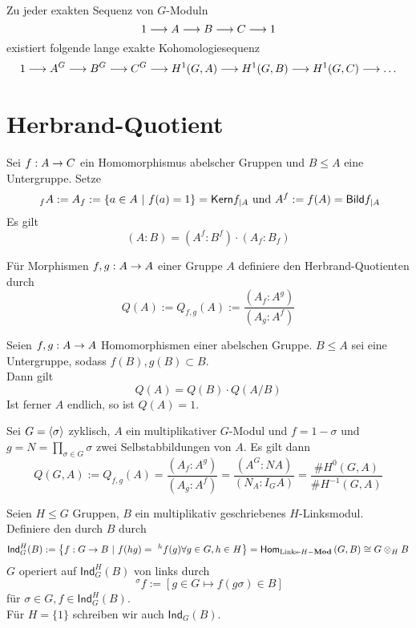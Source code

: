 \documentclass{book}
\renewcommand{\i}{^{-1}}
\begin{document}
Zu jeder exakten Sequenz von $G$-Moduln
\[ 1 \overset{}{\longrightarrow} A \overset{}{\longrightarrow} B \overset{}{\longrightarrow} C \overset{}{\longrightarrow} 1\]
existiert folgende lange exakte Kohomologiesequenz
\begin{align*}
1 \overset{}{\longrightarrow} A^G \overset{}{\longrightarrow} B^G \overset{}{\longrightarrow} C^G \overset{}{\longrightarrow} H^1(G,A) \overset{}{\longrightarrow} H^1(G,B) \overset{}{\longrightarrow} H^1(G,C) \overset{}{\longrightarrow} \ldots
\end{align*}

\section{Herbrand-Quotient}
\Lem{}
Sei $f : A \overset{}{\rightarrow} C$ ein Homomorphismus abelscher Gruppen und $B \leq A$ eine Untergruppe. Setze
\[ \ _fA := A_f := \set{a\in A}{f(a) = 1} = \Ker f_{|A} \text{ und } A^f := f(A) = \Img f_{|A} \]
Es gilt
\[ (A:B) = (A^f:B^f) \cdot (A_f : B_f) \]

Für Morphismen $f, g : A\overset{}{\rightarrow} A $ einer Gruppe $A$ definiere den Herbrand-Quotienten durch
\[ Q(A) := Q_{f,g}(A) := \frac{(A_f : A^g)}{(A_g : A^f)} \]

\Lem{}
Seien $f, g : A\overset{}{\rightarrow} A $ Homomorphismen einer abelschen Gruppe. $B \leq A$ sei eine Untergruppe, sodass $f(B),g(B) \subset B$.\\
Dann gilt
\[ Q(A) = Q(B) \cdot Q(A/B) \]
Ist ferner $A$ endlich, so ist $Q(A) = 1$.

\Bem{}
Sei $G = \left<\sigma\right>$ zyklisch, $A$ ein multiplikativer $G$-Modul und $f = 1 - \sigma$ und $g =N = \prod_{\sigma \in G}\sigma$ zwei Selbstabbildungen von $A$. Es gilt dann
\[ Q(G,A):=Q_{f,g}(A) = \frac{(A_f : A^g)}{(A_g : A^f)} = \frac{(A^G : NA)}{(N_A : I_GA)} = \frac{\# H^0(G,A)}{\# H\i(G,A)} \]

Seien $H\leq G$ Gruppen, $B$ ein multiplikativ geschriebenes $H$-Linksmodul.\\
Definiere den durch $B$  durch
\[ \textsf{Ind}_G^H(B) := \set{f : G \pfeil{} B}{f(hg) = \ ^hf(g) \forall g \in G, h\in H }  = \Hom{\text{Links-}H-\Mod}{G}{B} \isom{} G \otimes_{H} B \]
$G$ operiert auf $\textsf{Ind}^H_G(B)$ von links durch
\[ \ ^\sigma f := [g \in G \mapsto f(g\sigma) \in B ] \]
für $\sigma \in G, f \in \textsf{Ind}^H_G(B)$.\\
Für $H = \{1\}$ schreiben wir auch $\textsf{Ind}_G(B)$.
\end{document}

